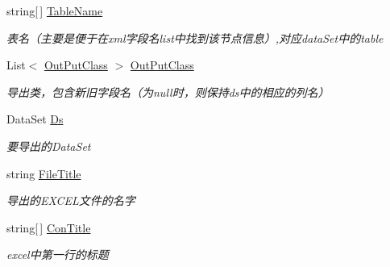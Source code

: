 \begin{DoxyCompactItemize}
\item 
string\mbox{[}$\,$\mbox{]} \hyperlink{class_x_c_l_net_tools_1_1_entity_1_1_office_1_1_excel_handler_1_1_out_put_param_class_a0a911a788ec6d71dd31abd3624400b67}{Table\-Name}
\begin{DoxyCompactList}\small\item\em 表名（主要是便于在xml字段名list中找到该节点信息）,对应data\-Set中的table \end{DoxyCompactList}\item 
List$<$ \hyperlink{class_x_c_l_net_tools_1_1_entity_1_1_office_1_1_excel_handler_1_1_out_put_class}{Out\-Put\-Class} $>$ \hyperlink{class_x_c_l_net_tools_1_1_entity_1_1_office_1_1_excel_handler_1_1_out_put_param_class_adc8f68c8e223e5653d29efabacc56b65}{Out\-Put\-Class}
\begin{DoxyCompactList}\small\item\em 导出类，包含新旧字段名（为null时，则保持ds中的相应的列名） \end{DoxyCompactList}\item 
Data\-Set \hyperlink{class_x_c_l_net_tools_1_1_entity_1_1_office_1_1_excel_handler_1_1_out_put_param_class_a3f2d60db6c0602122169dd392caed6c0}{Ds}
\begin{DoxyCompactList}\small\item\em 要导出的\-Data\-Set \end{DoxyCompactList}\item 
string \hyperlink{class_x_c_l_net_tools_1_1_entity_1_1_office_1_1_excel_handler_1_1_out_put_param_class_a9825b6c0aa98a7e758376b5de8af1991}{File\-Title}
\begin{DoxyCompactList}\small\item\em 导出的\-E\-X\-C\-E\-L文件的名字 \end{DoxyCompactList}\item 
string\mbox{[}$\,$\mbox{]} \hyperlink{class_x_c_l_net_tools_1_1_entity_1_1_office_1_1_excel_handler_1_1_out_put_param_class_a0acbd053010430b65a37f7c0b28e122e}{Con\-Title}
\begin{DoxyCompactList}\small\item\em excel中第一行的标题 \end{DoxyCompactList}\item 

\end{DoxyCompactItemize}
